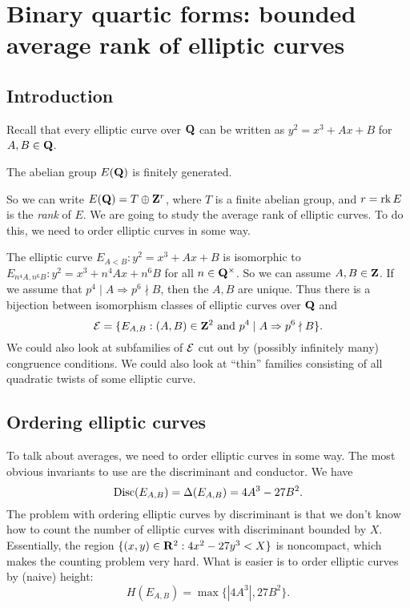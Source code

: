 
\section{Binary quartic forms: bounded average rank of elliptic curves}





\subsection{Introduction}

Recall that every elliptic curve over $\mathbf{Q}$ can be written as 
$y^2=x^3+A x+B$ for $A,B\in \mathbf{Q}$. 

\begin{theo}[Mordell]
The abelian group $E(\mathbf{Q})$ is finitely generated. 
\end{theo}

So we can write $E(\mathbf{Q})=T\oplus \mathbf{Z}^r$, where $T$ is a finite abelian group, 
and $r=\operatorname{rk} E$ is the \emph{rank} of $E$. We are going to study the average 
rank of elliptic curves. To do this, we need to order elliptic curves in some 
way. 

The elliptic curve $E_{A<B}:y^2=x^3+A x+B$ is isomorphic to 
$E_{n^4 A,n^6 B}:y^2=x^3+n^4 A x+n^6 B$ for all $n\in \mathbf{Q}^\times$. So we can 
assume $A,B\in \mathbf{Z}$. If we assume that $p^4\mid A\Rightarrow p^6\nmid B$, then 
the $A,B$ are unique. Thus there is a bijection between isomorphism classes of 
elliptic curves over $\mathbf{Q}$ and 
\[
  \mathcal{E} = \{E_{A,B}:(A,B)\in \mathbf{Z}^2\text{ and }p^4\mid A\Rightarrow p^6\nmid B\} .
\]
We could also look at subfamilies of $\mathcal{E}$ cut out by (possibly infinitely 
many) congruence conditions. We could also look at ``thin'' families consisting 
of all quadratic twists of some elliptic curve. 





\subsection{Ordering elliptic curves}

To talk about averages, we need to order elliptic curves in some way. The most 
obvious invariants to use are the discriminant and conductor. We have 
\[
  \operatorname{Disc}(E_{A,B}) = \Delta(E_{A,B}) = 4 A^3 - 27 B^2 .
\]
The problem with ordering elliptic curves by discriminant is that we don't know 
how to count the number of elliptic curves with discriminant bounded by $X$. 
Essentially, the region $\{(x,y)\in \mathbf{R}^2:4 x^2 - 27 y^3<X\}$ is noncompact, 
which makes the counting problem very hard. What is easier is to order elliptic 
curves by (naive) height: 
\[
  H(E_{A,B}) = \max\{|4 A^3|, 27 B^2\} .
\]

